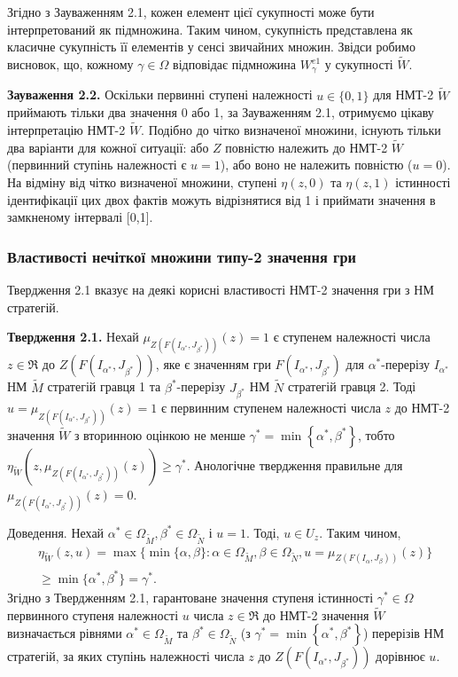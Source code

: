 \documentclass[14pt, a4paper, oneside]{extarticle}
\numberwithin{equation}{section}
\begin{document}
\noindent Згідно з Зауваженням 2.1, кожен елемент цієї сукупності може бути інтерпретований як підмножина. Таким чином, сукупність представлена як класичне сукупність її елементів у сенсі звичайних множин. Звідси робимо висновок, що, кожному $\gamma \in \Omega$ відповідає підмножина $W_{\gamma}^{e 1}$ у сукупності $\tilde{W}$.

\textbf{Зауваження 2.2.} Оскільки первинні ступені належності \( u \in \{0,1\} \) для НМТ-2 \( \tilde{W} \) приймають тільки два значення 0 або 1, за Зауваженням 2.1, отримуємо цікаву інтерпретацію НМТ-2 \( \tilde{W} \). Подібно до чітко визначеної множини, існують тільки два варіанти для кожної ситуації: або \( Z \) повністю належить до НМТ-2 \( \tilde{W} \) (первинний ступінь належності є \( u=1 \)), або воно не належить повністю (\( u=0 \)). На відміну від чітко визначеної множини, ступені \( \eta{(z,0)} \) та \( \eta{(z,1)} \) істинності ідентифікації цих двох фактів можуть відрізнятися від 1 і приймати значення в замкненому інтервалі [0,1].

\subsubsection*{Властивості нечіткої множини типу-2 значення гри}
Твердження 2.1 вказує на деякі корисні властивості НМТ-2 значення гри з НМ стратегій.

\textbf{Твердження 2.1.} Нехай $\mu_{Z\left(F\left(I_{\alpha^{*}}, J_{\beta^{*}}\right)\right)}(z) = 1 $ є ступенем належності числа $z \in \Re$ до $Z\left(F\left(I_{\alpha^{*}}, J_{\beta^{*}}\right)\right)$, яке є значенням гри $F\left(I_{\alpha^{*}}, J_{\beta^{*}}\right)$ для $\alpha^{*}$-перерізу $I_{\alpha^{*}}$ НМ $\tilde{M}$ стратегій гравця 1 та $\beta^{*}$-перерізу $J_{\beta^{*}}$ НМ $\tilde{N}$ стратегій гравця 2. Тоді $u=\mu_{Z\left(F\left(I_{\alpha^{*}}, J_{\beta^{*}}\right)\right)}(z) = 1$ є первинним ступенем належності числа $z$ до НМТ-2 значення $\tilde{W}$ з вторинною оцінкою не менше $\gamma^{*}=\min \left\{\alpha^{*}, \beta^{*}\right\}$, тобто $\eta_{\tilde{W}}\left(z, \mu_{Z\left(F\left(I_{\alpha^{*}}, J_{\beta^{*}}\right)\right)}(z)\right) \geq \gamma^{*}$.
Анологічне твердження правильне для $\mu_{Z\left(F\left(I_{\alpha^{*}}, J_{\beta^{*}}\right)\right)}(z) = 0$.

Доведення. Нехай $\alpha^{*} \in \Omega_{\tilde{M}}, \beta^{*} \in \Omega_{\tilde{N}}$ і $u=1$. Тоді, $u \in U_{z}$. Таким чином, 
\begin{align*}
    &\eta_{\tilde{W}}(z, u)=\max \{\min \{\alpha, \beta\}: \alpha \in \Omega_{\tilde{M}}, \beta \in \Omega_{\tilde{N}}, u=\mu_{Z\left(F\left(I_{\alpha}, J_{\beta}\right)\right)}(z)\}\\
    &\geq \min \{\alpha^{*}, \beta^{*}\}=\gamma^{*}.
\end{align*}
Згідно з Твердженням 2.1, гарантоване значення ступеня істинності $\gamma^{*} \in \Omega$ первинного ступеня належності $u$ числа $z \in \Re$ до НМТ-2 значення $\tilde{W}$ визначається рівнями $\alpha^{*} \in \Omega_{\tilde{M}}$ та $\beta^{*} \in \Omega_{\tilde{N}}$ (з $\gamma^{*}=\min \left\{\alpha^{*}, \beta^{*}\right\}$) перерізів НМ стратегій, за яких ступінь належності числа $z$ до $Z\left(F\left(I_{\alpha^{*}}, J_{\beta^{*}}\right)\right)$ дорівнює $u$.
\end{document}
